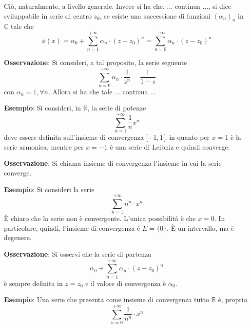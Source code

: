 \documentclass[a4paper]{extarticle}
\begin{document}
\vspace{1em}
\noindent
Ciò, naturalmente, a livello generale. Invece si ha che, ... continua ..., si dice sviluppabile in serie di centro $z_0$, se esiste una successione di funzioni $(\alpha_n)_n$ in $\mathbb{C}$ tale che
\[\phi(x) = \alpha_0 + \sum_{n=1}^{+\infty} \alpha_n \cdot (z-z_0)^n = \sum_{n=0}^{+\infty} \alpha_n \cdot (z-z_0)^n\]

\vspace{1em}
\noindent
\textbf{Osservazione}: Si consideri, a tal proposito, la serie seguente
\[\sum_{n=0}^{+\infty} \alpha_n \cdot \frac{1}{z^n} = \frac{1}{1-z}\]
con $\alpha_n=1, \forall n$. Allora si ha che tale ... continua ...

\vspace{1em}
\noindent
\textbf{Esempio}: Si consideri, in $\mathbb{R}$, la serie di potenze
\[\sum_{n=1}^{+\infty} \frac{1}{n} x^n\]
deve essere definita sull'insieme di convergenza $[-1,1[$, in quanto per $x=1$ è la serie armonica, mentre per $x=-1$ è una serie di Leibniz e quindi converge.

\vspace{1em}
\noindent
\textbf{Osservazione}: Si chiama insieme di convergenza l'insieme in cui la serie converge.

\vspace{1em}
\noindent
\textbf{Esempio}: Si consideri la serie
\[\sum_{n=1}^{+\infty} n^n \cdot x^n\]
È chiaro che la serie non è convergente. L'unica possibilità è che $x=0$. In particolare, quindi, l'insieme di convergenza è $E=\{0\}$. È un intervallo, ma è degenere.

\vspace{1em}
\noindent
\textbf{Osservazione}: Si osservi che la serie di partenza
\[\alpha_0 + \sum_{n=1}^{+\infty} \alpha_n \cdot (z-z_0)^n\]
è sempre definita in $z=z_0$ e il valore di convergenza è $\alpha_0$.

\vspace{1em}
\noindent
\textbf{Esempio}: Una serie che presenta come insieme di convergenza tutto $\mathbb{R}$ è, proprio
\[\sum_{n=0}^{+\infty} \frac{1}{n^n} \cdot x^n\]

\vspace{1em}
\end{document}
